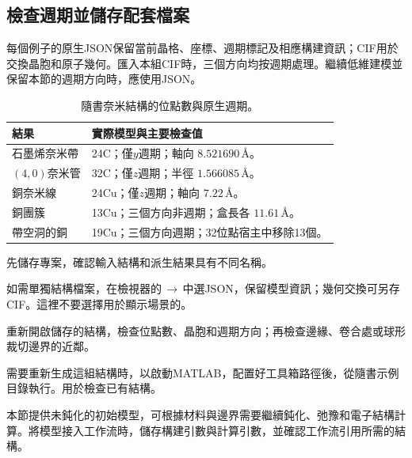 \subsection{檢查週期並儲存配套檔案}

每個例子的原生JSON保留當前晶格、座標、週期標記及相應構建資訊；CIF用於交換晶胞和原子幾何。匯入本組CIF時，三個方向均按週期處理。繼續低維建模並保留本節的週期方向時，應使用JSON。

\begin{table}[htbp]
\centering\small
\caption{隨書奈米結構的位點數與原生週期。}
\begin{tabularx}{\linewidth}{lX}
\toprule
結果 & 實際模型與主要檢查值\\
\midrule
石墨烯奈米帶 & 24C；僅$y$週期；軸向 $8.521690\,\text{\AA}$。\\
$(4,0)$奈米管 & 32C；僅$z$週期；半徑 $1.566085\,\text{\AA}$。\\
銅奈米線 & 24Cu；僅$z$週期；軸向 $7.22\,\text{\AA}$。\\
銅團簇 & 13Cu；三個方向非週期；盒長各 $11.61\,\text{\AA}$。\\
帶空洞的銅 & 19Cu；三個方向週期；32位點宿主中移除13個。\\
\bottomrule
\end{tabularx}
\end{table}

\begin{steps}
  \item 先儲存專案，確認輸入結構和派生結果具有不同名稱。
  \item 如需單獨結構檔案，在檢視器的\,$\rightarrow$\,中選JSON，保留模型資訊；幾何交換可另存CIF。這裡不要選擇用於顯示場景的。
  \item 重新開啟儲存的結構，檢查位點數、晶胞和週期方向；再檢查邊緣、卷合處或球形裁切邊界的近鄰。
  \item 需要重新生成這組結構時，以啟動MATLAB\regmark{}，配置好工具箱路徑後，從隨書示例目錄執行。用於檢查已有結構。
\end{steps}

本節提供未鈍化的初始模型，可根據材料與邊界需要繼續鈍化、弛豫和電子結構計算。將模型接入工作流時，儲存構建引數與計算引數，並確認工作流引用所需的結構。
